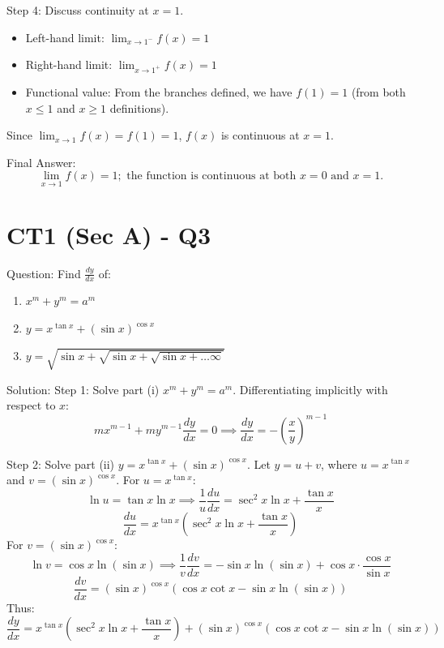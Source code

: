 \documentclass{article}
\begin{document}
Step 4: Discuss continuity at $x = 1$.
\begin{itemize}
    \item Left-hand limit: $\lim_{x \to 1^-} f(x) = 1$
    \item Right-hand limit: $\lim_{x \to 1^+} f(x) = 1$
    \item Functional value: From the branches defined, we have $f(1) = 1$ (from both $x \le 1$ and $x \ge 1$ definitions).
\end{itemize}
Since $\lim_{x \to 1} f(x) = f(1) = 1$, $f(x)$ is continuous at $x = 1$.

Final Answer:
\[
\boxed{\lim_{x \to 1} f(x) = 1; \text{ the function is continuous at both } x=0 \text{ and } x=1.}
\]

\section*{CT1 (Sec A) - Q3}
Question:
Find $\frac{dy}{dx}$ of:
\begin{enumerate}
    \item[(i)] $x^m + y^m = a^m$
    \item[(ii)] $y = x^{\tan x} + (\sin x)^{\cos x}$
    \item[(iii)] $y = \sqrt{\sin x + \sqrt{\sin x + \sqrt{\sin x + \dots \infty}}}$
\end{enumerate}

Solution:
Step 1: Solve part (i) $x^m + y^m = a^m$.
Differentiating implicitly with respect to $x$:
\[
m x^{m-1} + m y^{m-1} \frac{dy}{dx} = 0 \implies \frac{dy}{dx} = -\left(\frac{x}{y}\right)^{m-1}
\]

Step 2: Solve part (ii) $y = x^{\tan x} + (\sin x)^{\cos x}$.
Let $y = u + v$, where $u = x^{\tan x}$ and $v = (\sin x)^{\cos x}$.
For $u = x^{\tan x}$:
\[
\ln u = \tan x \ln x \implies \frac{1}{u} \frac{du}{dx} = \sec^2 x \ln x + \frac{\tan x}{x}
\]
\[
\frac{du}{dx} = x^{\tan x} \left( \sec^2 x \ln x + \frac{\tan x}{x} \right)
\]
For $v = (\sin x)^{\cos x}$:
\[
\ln v = \cos x \ln(\sin x) \implies \frac{1}{v} \frac{dv}{dx} = -\sin x \ln(\sin x) + \cos x \cdot \frac{\cos x}{\sin x}
\]
\[
\frac{dv}{dx} = (\sin x)^{\cos x} \left( \cos x \cot x - \sin x \ln(\sin x) \right)
\]
Thus:
\[
\frac{dy}{dx} = x^{\tan x} \left( \sec^2 x \ln x + \frac{\tan x}{x} \right) + (\sin x)^{\cos x} \left( \cos x \cot x - \sin x \ln(\sin x) \right)
\]
\end{document}
